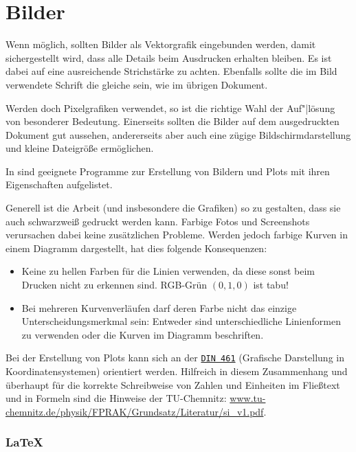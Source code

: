 \section{Bilder}
\label{sec:Latex-Bilder}

Wenn möglich, sollten Bilder als Vektorgrafik eingebunden werden, damit sichergestellt wird, dass alle Details beim Ausdrucken erhalten bleiben.
Es ist dabei auf eine ausreichende Strichstärke zu achten.
Ebenfalls sollte die im Bild verwendete Schrift die gleiche sein, wie im übrigen Dokument.

Werden doch Pixelgrafiken verwendet, so ist die richtige Wahl der Auf"|lösung von besonderer Bedeutung.
Einerseits sollten die Bilder auf dem ausgedruckten Dokument gut aussehen, andererseits aber auch eine zügige Bildschirmdarstellung und kleine Dateigröße ermöglichen.

In  sind geeignete Programme zur Erstellung von Bildern und Plots mit ihren Eigenschaften aufgelistet.

Generell ist die Arbeit (und insbesondere die Grafiken) so zu gestalten, dass sie auch schwarzweiß gedruckt werden kann.
Farbige Fotos und Screenshots verursachen dabei \iA keine zusätzlichen Probleme.
Werden jedoch \zB farbige Kurven in einem Diagramm dargestellt, hat dies folgende Konsequenzen:
\begin{itemize}
  \item Keine zu hellen Farben für die Linien verwenden, da diese sonst beim Drucken nicht zu erkennen sind.
    RGB-Grün $(0,1,0)$ ist tabu!
  \item Bei mehreren Kurvenverläufen darf deren Farbe nicht das einzige Unterscheidungsmerkmal sein: Entweder sind unterschiedliche Linienformen zu verwenden oder die Kurven im Diagramm beschriften.
\end{itemize}

Bei der Erstellung von Plots kann sich an der \href{http://de.wikipedia.org/wiki/DIN_461}{\texttt{DIN 461}} (Grafische Darstellung in Koordinatensystemen) orientiert werden.
Hilfreich in diesem Zusammenhang und überhaupt für die korrekte Schreibweise von Zahlen und Einheiten im Fließtext und in Formeln sind die Hinweise der TU-Chemnitz: \url{www.tu-chemnitz.de/physik/FPRAK/Grundsatz/Literatur/si_v1.pdf}.



\subsubsection*{\LaTeX}

